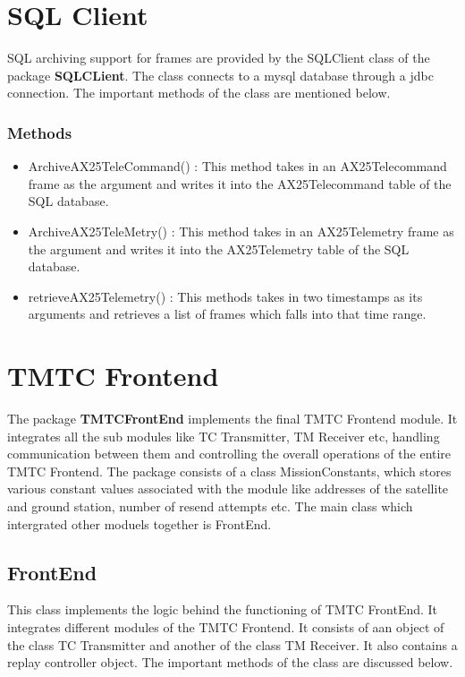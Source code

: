 \documentclass[BTech]{iitmdiss}
\begin{document}
\section{SQL Client}
SQL archiving support for frames are provided by the SQLClient class of the package \textbf{SQLCLient}. The class connects to a mysql database through a jdbc connection. The important methods of the class are mentioned below.
\subsubsection{Methods}
\begin{itemize}
\item ArchiveAX25TeleCommand() : This method takes in an AX25Telecommand frame as the argument and writes it into the AX25Telecommand table of the SQL database.
\item ArchiveAX25TeleMetry() :  This method takes in an AX25Telemetry frame as the argument and writes it into the AX25Telemetry table of the SQL database.
\item retrieveAX25Telemetry() : This methods takes in two timestamps as its arguments and retrieves a list of frames which falls into that time range. 
\end{itemize}

\section{TMTC Frontend}
The package \textbf{TMTCFrontEnd} implements the final  TMTC Frontend module. It integrates all the sub modules like TC Transmitter, TM Receiver etc,  handling communication between them and controlling the overall operations of the entire TMTC Frontend. The package consists of a class MissionConstants, which stores various constant values associated with the module like addresses of the satellite and ground station, number of resend attempts etc. The main class which intergrated other moduels together is FrontEnd.
\subsection{FrontEnd}
This class implements the logic behind the functioning of TMTC FrontEnd. It integrates different modules of the TMTC Frontend. It consists of aan object of the class TC Transmitter and another of the class TM Receiver. It also contains a replay controller object. The important methods of the class are discussed below.
\end{document}
